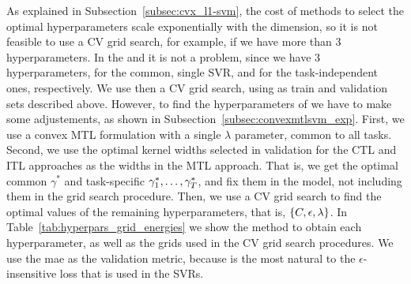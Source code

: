 %
As explained in Subsection~\ref{subsec:cvx_l1-svm}, the cost of methods to select the optimal hyperparameters scale exponentially with the dimension, so it is not feasible to use a CV grid search, for example, if we have more than $3$ hyperparameters.
%
In the  and  it is not a problem, since we have $3$ hyperparameters, for the common, single SVR, and for the task-independent ones, respectively. We use then a CV grid search, using as train and validation sets described above.
However, to find the hyperparameters of  we have to make some adjustements, as shown in Subsection~\ref{subsec:convexmtlsvm_exp}. 
%
First, we use a convex MTL formulation with a single $\lambda$ parameter, common to all tasks.
%
Second, we use the optimal kernel widths selected in validation for the CTL and ITL approaches as the widths in the MTL approach. That is, we get the optimal common $\gamma^*$ and task-specific $\gamma^*_1, \ldots, \gamma^*_T$, and fix them in the  model, not including them in the grid search procedure.
Then, we use a CV grid search to find the optimal values of the remaining hyperparameters, that is, $\left\{C, \epsilon, \lambda\right\}$.
%
In Table~\ref{tab:hyperpars_grid_energies} we show the method to obtain each hyperparameter, as well as the grids used in the CV grid search procedures.
We use the \acrshort{mae} as the validation metric, because is the most natural to the $\epsilon$-insensitive loss that is used in the SVRs.


